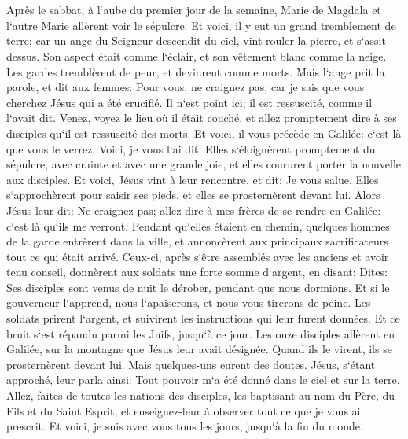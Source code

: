 \chapter{}

\verse Après le sabbat, à l`aube du premier jour de la semaine, Marie de Magdala et l`autre Marie allèrent voir le sépulcre. 
\verse Et voici, il y eut un grand tremblement de terre; car un ange du Seigneur descendit du ciel, vint rouler la pierre, et s`assit dessus. 
\verse Son aspect était comme l`éclair, et son vêtement blanc comme la neige. 
\verse Les gardes tremblèrent de peur, et devinrent comme morts. 
\verse Mais l`ange prit la parole, et dit aux femmes: Pour vous, ne craignez pas; car je sais que vous cherchez Jésus qui a été crucifié. 
\verse Il n`est point ici; il est ressuscité, comme il l`avait dit. Venez, voyez le lieu où il était couché, 
\verse et allez promptement dire à ses disciples qu`il est ressuscité des morts. Et voici, il vous précède en Galilée: c`est là que vous le verrez. Voici, je vous l`ai dit. 
\verse Elles s`éloignèrent promptement du sépulcre, avec crainte et avec une grande joie, et elles coururent porter la nouvelle aux disciples. 
\verse Et voici, Jésus vint à leur rencontre, et dit: Je vous salue. Elles s`approchèrent pour saisir ses pieds, et elles se prosternèrent devant lui. 
\verse Alors Jésus leur dit: Ne craignez pas; allez dire à mes frères de se rendre en Galilée: c`est là qu`ils me verront. 
\verse Pendant qu`elles étaient en chemin, quelques hommes de la garde entrèrent dans la ville, et annoncèrent aux principaux sacrificateurs tout ce qui était arrivé. 
\verse Ceux-ci, après s`être assemblés avec les anciens et avoir tenu conseil, donnèrent aux soldats une forte somme d`argent, 
\verse en disant: Dites: Ses disciples sont venus de nuit le dérober, pendant que nous dormions. 
\verse Et si le gouverneur l`apprend, nous l`apaiserons, et nous vous tirerons de peine. 
\verse Les soldats prirent l`argent, et suivirent les instructions qui leur furent données. Et ce bruit s`est répandu parmi les Juifs, jusqu`à ce jour. 
\verse Les onze disciples allèrent en Galilée, sur la montagne que Jésus leur avait désignée. 
\verse Quand ils le virent, ils se prosternèrent devant lui. Mais quelques-uns eurent des doutes. 
\verse Jésus, s`étant approché, leur parla ainsi: Tout pouvoir m`a été donné dans le ciel et sur la terre. 
\verse Allez, faites de toutes les nations des disciples, les baptisant au nom du Père, du Fils et du Saint Esprit, 
\verse et enseignez-leur à observer tout ce que je vous ai prescrit. Et voici, je suis avec vous tous les jours, jusqu`à la fin du monde. 
